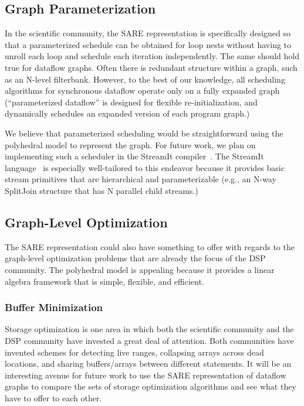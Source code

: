 \subsection{Graph Parameterization}

In the scientific community, the SARE representation is specifically
designed so that a parameterized schedule can be obtained for loop
nests without having to unroll each loop and schedule each iteration
independently.  The same should hold true for dataflow graphs.  Often
there is redundant structure within a graph, such as an N-level
filterbank.  However, to the best of our knowledge, all scheduling
algorithms for synchronous dataflow operate only on a fully expanded
graph (``parameterized dataflow''\cite{Bhatt00} is designed for
flexible re-initialization, and dynamically schedules an expanded
version of each program graph.)

We believe that parameterized scheduling would be straightforward
using the polyhedral model to represent the graph.  For future work,
we plan on implementing such a scheduler in the StreamIt
compiler~\cite{Gordo02}.  The StreamIt language~\cite{streamitcc} is
especially well-tailored to this endeavor because it provides basic
stream primitives that are hierarchical and parameterizable (e.g., an
N-way SplitJoin structure that has N parallel child streams.)

\subsection{Graph-Level Optimization}

The SARE representation could also have something to offer with
regards to the graph-level optimization problems that are already the
focus of the DSP community.  The polyhedral model is appealing because
it provides a linear algebra framework that is simple, flexible, and
efficient.

\subsubsection{Buffer Minimization}

Storage optimization is one area in which both the scientific
community\cite{Lim01,Quillere,Thies01,Lefebvre98} and the DSP
community\cite{murt1997x1,GGD94,murt2001x1} have invested a great deal
of attention.  Both communities have invented schemes for detecting
live ranges, collapsing arrays across dead locations, and sharing
buffers/arrays between different statements.  It will be an
interesting avenue for future work to use the SARE representation of
dataflow graphs to compare the sets of storage optimization algorithms
and see what they have to offer to each other.

